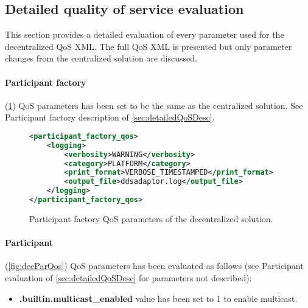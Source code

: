 \subsection{Detailed quality of service evaluation}

This section provides a detailed evaluation of every parameter used for the decentralized QoS XML. The full QoS XML is presented but only parameter changes from the centralized solution are discussed.

\paragraph{Participant factory} (\cref{fig:decParFacQos}) QoS parameters has been set to be the same as the centralized solution. See Participant factory description of \cref{sec:detailedQoSDesc}.

\begin{figure}[!h]
\begin{lstlisting}[language=XML]
<participant_factory_qos>
	<logging>
		<verbosity>WARNING</verbosity>
		<category>PLATFORM</category>
		<print_format>VERBOSE_TIMESTAMPED</print_format>
		<output_file>ddsadaptor.log</output_file>
	</logging>
</participant_factory_qos>
\end{lstlisting}
\caption[Decentralized participant factory QoS parameters]{
		\label{fig:decParFacQos} 
		\footnotesize{Participant factory QoS parameters of the decentralized solution.}
	}
\end{figure}

\paragraph{Participant} (\cref{fig:decParQos}) QoS parameters has been evaluated as follows (see Participant evaluation of \cref{sec:detailedQoSDesc} for parameters not described):

\begin{itemize}
	\item \textbf{.builtin.multicast\_enabled} value has been set to 1 to enable multicast.
\end{itemize}

